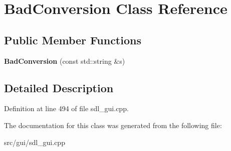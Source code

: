 \hypertarget{classBadConversion}{\section{Bad\-Conversion Class Reference}
\label{classBadConversion}
}
\subsection*{Public Member Functions}
\begin{DoxyCompactItemize}
\item 
\hypertarget{classBadConversion_acf304d65e2a3f8a7ff2aa489ca3f28d6}{{\bfseries Bad\-Conversion} (const std\-::string \&s)}\label{classBadConversion_acf304d65e2a3f8a7ff2aa489ca3f28d6}

\end{DoxyCompactItemize}


\subsection{Detailed Description}


Definition at line 494 of file sdl\-\_\-gui.\-cpp.



The documentation for this class was generated from the following file\-:\begin{DoxyCompactItemize}
\item 
src/gui/sdl\-\_\-gui.\-cpp\end{DoxyCompactItemize}
